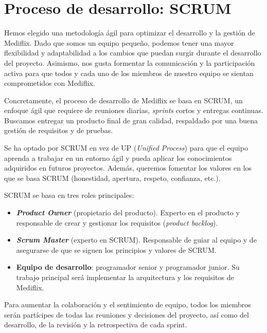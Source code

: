 \documentclass[../main.tex]{subfiles}
\begin{document}
\section{Proceso de desarrollo: SCRUM}

Hemos elegido una metodología ágil para optimizar el desarrollo y la gestión de Mediflix. Dado que somos un equipo pequeño, podemos tener una mayor flexibilidad y adaptabilidad a los cambios que puedan surgir durante el desarrollo del proyecto. Asimismo, nos gusta formentar la comunicación y la participación activa para que todos y cada uno de los miembros de nuestro equipo se sientan comprometidos con Mediflix.\par

Concretamente, el proceso de desarrollo de Mediflix se basa en SCRUM, un enfoque ágil que requiere de reuniones diarias, \textit{sprints} cortos y entregas continuas. Buscamos entregar un producto final de gran calidad, respaldado por una buena gestión de requisitos y de pruebas.\par

Se ha optado por SCRUM en vez de UP (\textit{Unified Process}) para que el equipo aprenda a trabajar en un entorno ágil y pueda aplicar los conocimientos adquiridos en futuros proyectos. Además, queremos fomentar los valores en los que se basa SCRUM (honestidad, apertura, respeto, confianza, etc.).\par

SCRUM se basa en tres roles principales:\par
\begin{itemize}
    \item \textbf{\textit{Product Owner}} (propietario del producto). Experto en el producto y responsable de crear y gestionar los requisitos (\textit{product backlog}).
    \item \textbf{\textit{Scrum Master}} (experto en SCRUM). Responsable de guiar al equipo y de asegurarse de que se siguen los principios y valores de SCRUM.
    \item \textbf{Equipo de desarrollo}: programador senior y programador junior. Su trabajo principal será implementar la arquitectura y los requisitos de Mediflix.
\end{itemize}

Para aumentar la colaboración y el sentimiento de equipo, todos los miembros serán partícipes de todas las reuniones y decisiones del proyecto, así como del desarrollo, de la revisión y la retrospectiva de cada sprint. \par
\end{document}
